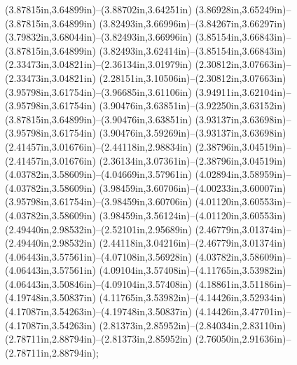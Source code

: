(3.87815in,3.64899in)--(3.88702in,3.64251in) (3.86928in,3.65249in)--(3.87815in,3.64899in) (3.82493in,3.66996in)--(3.84267in,3.66297in) (3.79832in,3.68044in)--(3.82493in,3.66996in) (3.85154in,3.66843in)--(3.87815in,3.64899in) (3.82493in,3.62414in)--(3.85154in,3.66843in) (2.33473in,3.04821in)--(2.36134in,3.01979in) (2.30812in,3.07663in)--(2.33473in,3.04821in) (2.28151in,3.10506in)--(2.30812in,3.07663in) (3.95798in,3.61754in)--(3.96685in,3.61106in) (3.94911in,3.62104in)--(3.95798in,3.61754in) (3.90476in,3.63851in)--(3.92250in,3.63152in) (3.87815in,3.64899in)--(3.90476in,3.63851in) (3.93137in,3.63698in)--(3.95798in,3.61754in) (3.90476in,3.59269in)--(3.93137in,3.63698in) (2.41457in,3.01676in)--(2.44118in,2.98834in) (2.38796in,3.04519in)--(2.41457in,3.01676in) (2.36134in,3.07361in)--(2.38796in,3.04519in) (4.03782in,3.58609in)--(4.04669in,3.57961in) (4.02894in,3.58959in)--(4.03782in,3.58609in) (3.98459in,3.60706in)--(4.00233in,3.60007in) (3.95798in,3.61754in)--(3.98459in,3.60706in) (4.01120in,3.60553in)--(4.03782in,3.58609in) (3.98459in,3.56124in)--(4.01120in,3.60553in) (2.49440in,2.98532in)--(2.52101in,2.95689in) (2.46779in,3.01374in)--(2.49440in,2.98532in) (2.44118in,3.04216in)--(2.46779in,3.01374in) (4.06443in,3.57561in)--(4.07108in,3.56928in) (4.03782in,3.58609in)--(4.06443in,3.57561in) (4.09104in,3.57408in)--(4.11765in,3.53982in) (4.06443in,3.50846in)--(4.09104in,3.57408in) (4.18861in,3.51186in)--(4.19748in,3.50837in) (4.11765in,3.53982in)--(4.14426in,3.52934in) (4.17087in,3.54263in)--(4.19748in,3.50837in) (4.14426in,3.47701in)--(4.17087in,3.54263in) (2.81373in,2.85952in)--(2.84034in,2.83110in) (2.78711in,2.88794in)--(2.81373in,2.85952in) (2.76050in,2.91636in)--(2.78711in,2.88794in);
